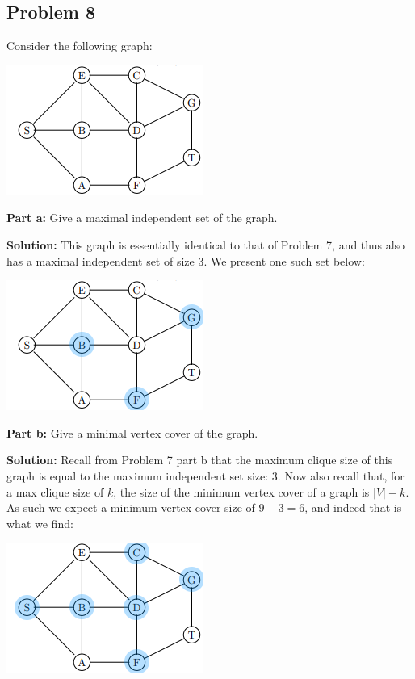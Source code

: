 \documentclass{article}
\begin{document}
\subsection*{Problem 8}
Consider the following graph:
\begin{center}
  \includegraphics{graph8.png}
\end{center}

\noindent\textbf{Part a:} Give a maximal independent set of the graph.
\bigskip

\noindent\textbf{Solution:} This graph is essentially identical to that of Problem 7, and thus also has a maximal independent set of size 3. We present one such set below:
\begin{center}
  \includegraphics{graph8a.png}
\end{center}

\noindent\textbf{Part b:} Give a minimal vertex cover of the graph.
\bigskip

\noindent\textbf{Solution:} Recall from Problem 7 part b that the maximum clique size of this graph is equal to the maximum independent set size: 3. Now also recall that, for a max clique size of $k$, the size of the minimum vertex cover of a graph is $|V|-k$. As such we expect a minimum vertex cover size of $9-3=6$, and indeed that is what we find:
\begin{center}
  \includegraphics{graph8b.png}
\end{center}
\end{document}
